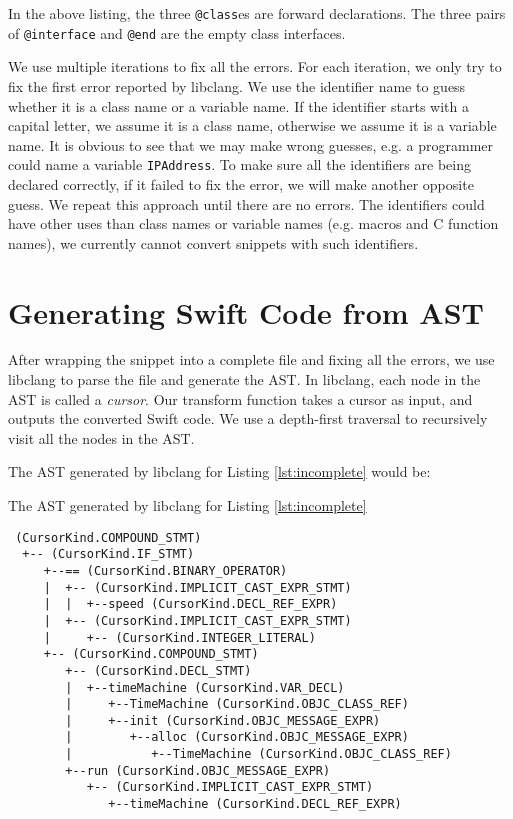 \documentclass{sfuthesis}
\begin{document}
In the above listing, the three \texttt{@class}es are forward declarations. The three pairs of \texttt{@interface} and \texttt{@end} are the empty class interfaces.

We use multiple iterations to fix all the errors. For each iteration, we only try to fix the first error reported by libclang. We use the identifier name to guess whether it is a class name or a variable name. If the identifier starts with a capital letter, we assume it is a class name, otherwise we assume it is a variable name. It is obvious to see that we may make wrong guesses, e.g. a programmer could name a variable \texttt{IPAddress}. To make sure all the identifiers are being declared correctly, if it failed to fix the error, we will make another opposite guess. We repeat this approach until there are no errors. The identifiers could have other uses than class names or variable names (e.g. macros and C function names), we currently cannot convert snippets with such identifiers.

\section{Generating Swift Code from AST}

After wrapping the snippet into a complete file and fixing all the errors, we use libclang to parse the file and generate the AST. In libclang, each node in the AST is called a \emph{cursor}. Our transform function takes a cursor as input, and outputs the converted Swift code. We use a depth-first traversal to recursively visit all the nodes in the AST.

The AST generated by libclang for Listing \ref{lst:incomplete} would be:

\begin{listing}[H]
\caption{The AST generated by libclang for Listing \ref{lst:incomplete}}
\label{lst:ast}
\begin{verbatim}
 (CursorKind.COMPOUND_STMT)
  +-- (CursorKind.IF_STMT)
     +--== (CursorKind.BINARY_OPERATOR)
     |  +-- (CursorKind.IMPLICIT_CAST_EXPR_STMT)
     |  |  +--speed (CursorKind.DECL_REF_EXPR)
     |  +-- (CursorKind.IMPLICIT_CAST_EXPR_STMT)
     |     +-- (CursorKind.INTEGER_LITERAL)
     +-- (CursorKind.COMPOUND_STMT)
        +-- (CursorKind.DECL_STMT)
        |  +--timeMachine (CursorKind.VAR_DECL)
        |     +--TimeMachine (CursorKind.OBJC_CLASS_REF)
        |     +--init (CursorKind.OBJC_MESSAGE_EXPR)
        |        +--alloc (CursorKind.OBJC_MESSAGE_EXPR)
        |           +--TimeMachine (CursorKind.OBJC_CLASS_REF)
        +--run (CursorKind.OBJC_MESSAGE_EXPR)
           +-- (CursorKind.IMPLICIT_CAST_EXPR_STMT)
              +--timeMachine (CursorKind.DECL_REF_EXPR)
\end{verbatim}
\end{listing}
\end{document}
